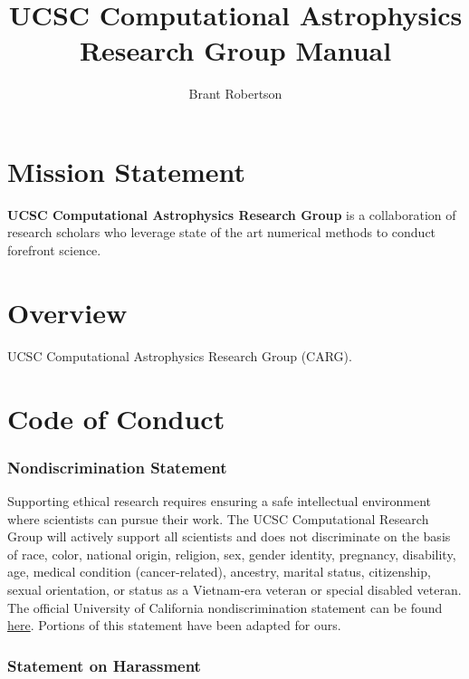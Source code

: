 \documentclass[fleqn,10pt]{wlscirep}
\title{\boldmath UCSC Computational Astrophysics Research Group Manual}
\author[1]{Brant Robertson}
\affiliation[1]{Department of Astronomy and Astrophysics, University of California, Santa Cruz, Santa Cruz, CA 95064}
\begin{document}
\maketitle
\flushbottom

\newpage

\section{Mission Statement}
\label{sec:mission}
{\bf UCSC Computational Astrophysics Research Group} is a collaboration of
research scholars who leverage state of the art numerical methods to conduct
forefront science.

\newpage


\section{Overview}
\label{sec:overview}

UCSC Computational Astrophysics Research Group (CARG).

\newpage
\section{Code of Conduct}
\label{sec:code_of_conduct}

\subsubsection{Nondiscrimination Statement}

Supporting ethical research requires ensuring a safe intellectual
environment where scientists can pursue their work. The UCSC
Computational Research Group will actively support all scientists
and does not discriminate on the 
basis of race, color, national origin, religion, sex, gender identity,
pregnancy, disability, age, medical condition (cancer-related), ancestry,
marital status, citizenship, sexual orientation, or status as a Vietnam-era
veteran or special disabled veteran.\\

\noindent
The official University of California nondiscrimination statement can
be found \href{https://www.ucop.edu/operating-budget/fees-and-enrollments/policies-and-resources/nondiscrimination-statement.html}{here}. Portions of this statement have been 
adapted for ours.

\subsubsection{Statement on Harassment}
\end{document}
